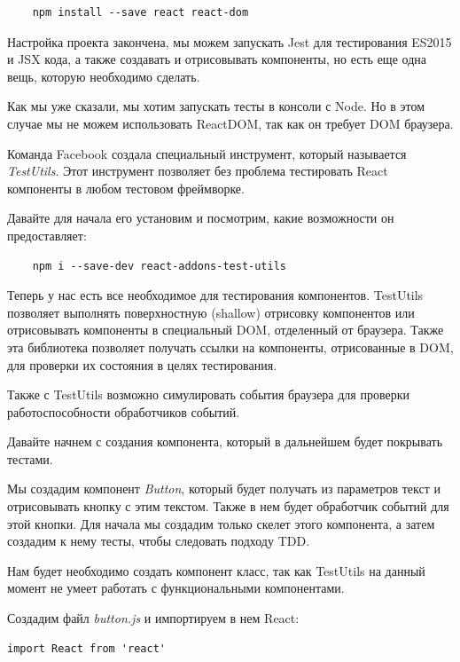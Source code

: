 \begin{lstlisting}
	npm install --save react react-dom
\end{lstlisting}

Настройка проекта закончена, мы можем запускать Jest для тестирования ES2015 и JSX кода, а также создавать и отрисовывать компоненты, но есть еще одна вещь, которую необходимо сделать.

Как мы уже сказали, мы хотим запускать тесты в консоли с Node. Но в этом случае мы не можем использовать ReactDOM, так как он требует DOM браузера.

Команда Facebook создала специальный инструмент, который называется \textit{TestUtils}. Этот инструмент позволяет без проблема тестировать React компоненты в любом тестовом фреймворке.

Давайте для начала его установим и посмотрим, какие возможности он предоставляет:

\begin{lstlisting}
	npm i --save-dev react-addons-test-utils
\end{lstlisting}

Теперь у нас есть все необходимое для тестирования компонентов. TestUtils позволяет выполнять поверхностную (shallow) отрисовку компонентов или отрисовывать компоненты в специальный DOM, отделенный от браузера. Также эта библиотека позволяет получать ссылки на компоненты, отрисованные в DOM, для проверки их состояния в целях тестирования.

Также с TestUtils возможно симулировать события браузера для проверки работоспособности обработчиков событий.

Давайте начнем с создания компонента, который в дальнейшем будет покрывать тестами.

Мы создадим компонент \textit{Button}, который будет получать из параметров текст и отрисовывать кнопку с этим текстом. Также в нем будет обработчик событий для этой кнопки. Для начала мы создадим только скелет этого компонента, а затем создадим к нему тесты, чтобы следовать подходу TDD.

Нам будет необходимо создать компонент класс, так как TestUtils на данный момент не умеет работать с функциональными компонентами.

Создадим файл \textit{button.js} и импортируем в нем React:

\begin{lstlisting}
import React from 'react'
\end{lstlisting}

